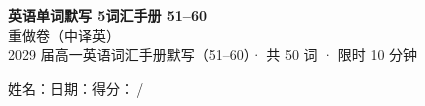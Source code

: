 \documentclass[11pt,a4paper]{article}
\begin{document}
\begin{center}
{\LARGE\bfseries 英语单词默写 5\quad 词汇手册 51--60}\\[0.2em]
{\large 重做卷（中译英）}\\[0.25em]
{\footnotesize 2029 届高一英语词汇手册默写（51--60）· 共 50 词 · 限时 10 分钟}
\end{center}

\vspace{-0.2em}
\noindent{\color{rulegray}\rule{\textwidth}{0.8pt}}

\vspace{0.3em}
\noindent 姓名：\underline{\hspace{2.6cm}}\qquad 日期：\underline{\hspace{2.4cm}}\qquad 得分：\underline{\hspace{1.6cm}}\,/
\end{document}
